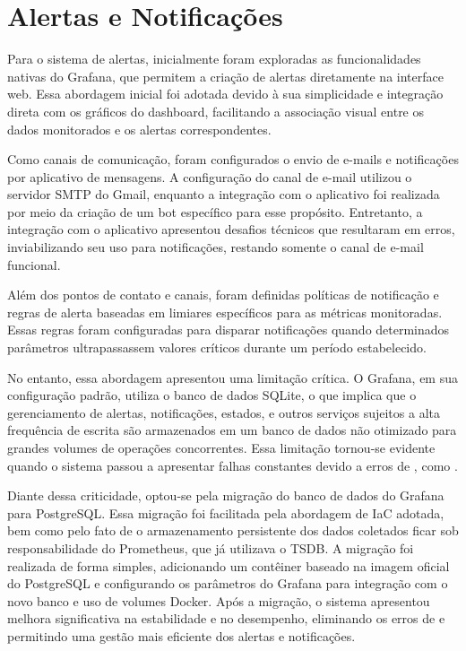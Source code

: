 {\section{Alertas e Notificações}
\label{section:Alertas}

Para o sistema de alertas, inicialmente foram exploradas as funcionalidades nativas do Grafana, que permitem a criação de alertas diretamente na interface web. Essa abordagem inicial foi adotada devido à sua simplicidade e integração direta com os gráficos do dashboard, facilitando a associação visual entre os dados monitorados e os alertas correspondentes.

Como canais de comunicação, foram configurados o envio de e-mails e notificações por aplicativo de mensagens. A configuração do canal de e-mail utilizou o servidor SMTP do Gmail, enquanto a integração com o aplicativo foi realizada por meio da criação de um bot específico para esse propósito. Entretanto, a integração com o aplicativo apresentou desafios técnicos que resultaram em erros, inviabilizando seu uso para notificações, restando somente o canal de e-mail funcional.

Além dos pontos de contato e canais, foram definidas políticas de notificação e regras de alerta baseadas em limiares específicos para as métricas monitoradas. Essas regras foram configuradas para disparar notificações quando determinados parâmetros ultrapassassem valores críticos durante um período estabelecido.

No entanto, essa abordagem apresentou uma limitação crítica. O Grafana, em sua configuração padrão, utiliza o banco de dados SQLite, o que implica que o gerenciamento de alertas, notificações, estados,  e outros serviços sujeitos a alta frequência de escrita são armazenados em um banco de dados não otimizado para grandes volumes de operações concorrentes. Essa limitação tornou-se evidente quando o sistema passou a apresentar falhas constantes devido a erros de , como .

Diante dessa criticidade, optou-se pela migração do banco de dados do Grafana para PostgreSQL. Essa migração foi facilitada pela abordagem de IaC adotada, bem como pelo fato de o armazenamento persistente dos dados coletados ficar sob responsabilidade do Prometheus, que já utilizava o TSDB. A migração foi realizada de forma simples, adicionando um contêiner baseado na imagem oficial do PostgreSQL e configurando os parâmetros do Grafana para integração com o novo banco e uso de volumes Docker. Após a migração, o sistema apresentou melhora significativa na estabilidade e no desempenho, eliminando os erros de  e permitindo uma gestão mais eficiente dos alertas e notificações.

}

